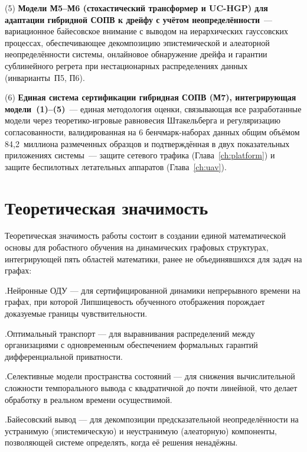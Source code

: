 (5) \textbf{Модели М5--М6 (стохастический трансформер и UC-HGP) для
адаптации гибридной СОПВ к дрейфу с учётом неопределённости}~---
вариационное байесовское внимание с выводом на иерархических
гауссовских процессах, обеспечивающее декомпозицию эпистемической и
алеаторной неопределённости системы, онлайновое обнаружение дрейфа
и гарантии сублинейного регрета при нестационарных распределениях
данных (инварианты~П5, П6).

(6) \textbf{Единая система сертификации гибридная СОПВ (М7),
интегрирующая модели~(1)--(5)}~--- единая методология оценки,
связывающая все разработанные модели через теоретико-игровые
равновесия Штакельберга и регуляризацию согласованности,
валидированная на 6 бенчмарк-наборах данных общим объёмом
84{,}2~миллиона размеченных образцов и подтверждённая в двух
показательных приложениях системы~--- защите сетевого трафика
(Глава~\ref{ch:platform}) и защите беспилотных летательных аппаратов
(Глава~\ref{ch:uav}).

\section*{Теоретическая значимость}

Теоретическая значимость работы состоит в создании единой математической основы для робастного обучения на динамических графовых структурах, интегрирующей пять областей математики, ранее не объединявшихся для задач на графах:

.\quad Нейронные ОДУ --- для сертифицированной динамики непрерывного времени на графах, при которой Липшицевость обученного отображения порождает доказуемые границы чувствительности.

.\quad Оптимальный транспорт --- для выравнивания распределений между организациями с одновременным обеспечением формальных гарантий дифференциальной приватности.

.\quad Селективные модели пространства состояний --- для снижения вычислительной сложности темпорального вывода с квадратичной до почти линейной, что делает обработку в реальном времени осуществимой.

.\quad Байесовский вывод --- для декомпозиции предсказательной неопределённости на устранимую (эпистемическую) и неустранимую (алеаторную) компоненты, позволяющей системе определять, когда её решения ненадёжны.

